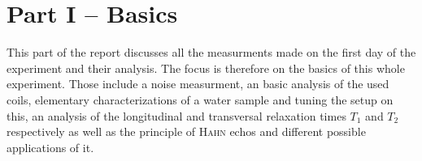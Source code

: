 \section{Part I -- Basics}
\label{sec:PartI}
This part of the report discusses all the measurments made on the first day of the experiment and their analysis.
The focus is therefore on the basics of this whole experiment. Those include a noise measurment, an basic analysis of the used coils, elementary characterizations of a water sample and tuning the setup on this, an analysis of the  longitudinal and transversal relaxation times $T_1$ and $T_2$ respectively as well as the principle of \textsc{Hahn} echos and different possible applications of it.